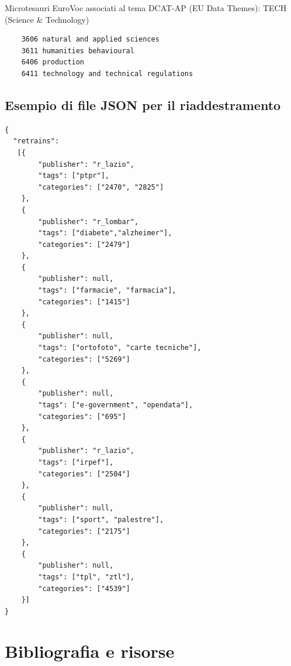 \documentclass{article}
\theoremstyle{plain}
\theoremstyle{definition}
\begin{document}
Microtesauri EuroVoc associati al tema DCAT-AP (EU Data Themes): TECH (Science \& Technology)
\begin{verbatim}
    3606 natural and applied sciences 
    3611 humanities behavioural 
    6406 production 
    6411 technology and technical regulations
\end{verbatim}
\newpage
\subsection{Esempio di file JSON per il riaddestramento}
\begin{verbatim}
{
  "retrains": 
   [{
        "publisher": "r_lazio",
        "tags": ["ptpr"],
        "categories": ["2470", "2825"]
    },
    {
        "publisher": "r_lombar",
        "tags": ["diabete","alzheimer"],
        "categories": ["2479"]
    },
    {
        "publisher": null,
        "tags": ["farmacie", "farmacia"],
        "categories": ["1415"]
    },
    {
        "publisher": null,
        "tags": ["ortofoto", "carte tecniche"],
        "categories": ["5269"]
    },
    {
        "publisher": null,
        "tags": ["e-government", "opendata"],
        "categories": ["695"]
    },
    {
        "publisher": "r_lazio",
        "tags": ["irpef"],
        "categories": ["2504"]
    },
    {
        "publisher": null,
        "tags": ["sport", "palestre"],
        "categories": ["2175"]
    },
    {
        "publisher": null,
        "tags": ["tpl", "ztl"], 
        "categories": ["4539"]
    }]
}
\end{verbatim}

\newpage
\section{Bibliografia e risorse}
\end{document}
